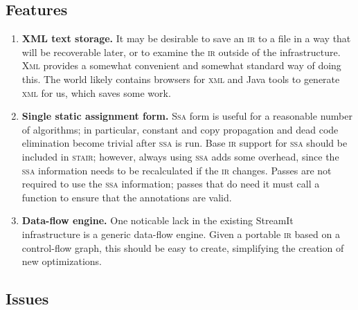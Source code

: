 \documentclass[11pt]{article}
\def\ir{\textsc{ir}}
\def\ssa{\textsc{ssa}}
\def\Ssa{\textsc{Ssa}}
\def\stair{\textsc{stair}}
\def\xml{\textsc{xml}}
\def\Xml{\textsc{Xml}}
\begin{document}
\subsection{Features}

\begin{enumerate}
\item \textbf{XML text storage.}  It may be desirable to save an \ir{}
  to a file in a way that will be recoverable later, or to examine the
  \ir{} outside of the infrastructure.  \Xml{} provides a somewhat
  convenient and somewhat standard way of doing this.  The world
  likely contains browsers for \xml{} and Java tools to generate
  \xml{} for us, which saves some work.
\item \textbf{Single static assignment form.}  \Ssa{} form is useful
  for a reasonable number of algorithms; in particular, constant and
  copy propagation and dead code elimination become trivial after
  \ssa{} is run.  Base \ir{} support for \ssa{} should be included in
  \stair; however, always using \ssa{} adds some overhead, since the
  \ssa{} information needs to be recalculated if the \ir{} changes.
  Passes are not required to use the \ssa{} information; passes that
  do need it must call a function to ensure that the annotations are
  valid.
\item \textbf{Data-flow engine.}  One noticable lack in the existing
  StreamIt infrastructure is a generic data-flow engine.  Given a
  portable \ir{} based on a control-flow graph, this should be easy to
  create, simplifying the creation of new optimizations.
\end{enumerate}

\subsection{Issues}
\end{document}
